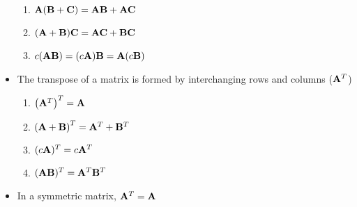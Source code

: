 \documentclass[12pt]{article}
\begin{document}
\begin{itemize}
\begin{enumerate}
      \item $\bold{A}(\bold{B}+\bold{C})=\bold{AB}+\bold{AC}$

      \item $(\bold{A}+\bold{B})\bold{C}=\bold{AC}+\bold{BC}$

      \item $c(\bold{AB})=(c\bold{A})\bold{B}=\bold{A}(c\bold{B})$

    \end{enumerate}

  \item The transpose of a matrix is formed by interchanging rows and columns ($\bold{A}^T$)

    \begin{enumerate}

      \item $\left( \bold{A}^T \right)^T=\bold{A}$

      \item $\left( \bold{A} + \bold{B} \right)^T=\bold{A}^T + \bold{B}^T$

      \item $(c\bold{A})^T=c\bold{A}^T$

      \item $(\bold{AB})^T=\bold{A}^T\bold{B}^T$

    \end{enumerate}

  \item In a symmetric matrix, $\bold{A}^T=\bold{A}$

\end{itemize}
\end{document}
